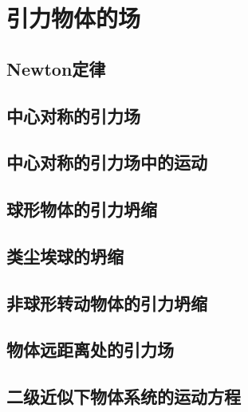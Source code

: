 \chapter{引力物体的场}

\section{Newton定律}

\section{中心对称的引力场}

\section{中心对称的引力场中的运动}

\section{球形物体的引力坍缩}

\section{类尘埃球的坍缩}

\section{非球形转动物体的引力坍缩}

\section{物体远距离处的引力场}

\section{二级近似下物体系统的运动方程}

